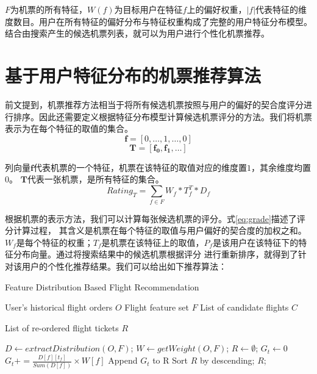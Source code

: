 $F$为机票的所有特征，$W(f)$为目标用户在特征$f$上的偏好权重，$|f|$代表特征的维度数目。用户在所有特征的偏好分布与特征权重构成了完整的用户特征分布模型。结合由搜索产生的候选机票列表，就可以为用户进行个性化机票推荐。

\section{基于用户特征分布的机票推荐算法}

前文提到，机票推荐方法相当于将所有候选机票按照与用户的偏好的契合度评分进行排序。因此还需要定义根据特征分布模型计算候选机票评分的方法。我们将机票表示为在每个特征的取值的集合。
\begin{equation}
  \mathbf{f} = [0,\dots,1,\dots,0]
\end{equation}
\begin{equation}
  \mathbf{T} = [\mathbf{f_0},\mathbf{f_1},\dots]
\end{equation}\par
列向量$\mathbf{f}$代表机票的一个特征，机票在该特征的取值对应的维度置$1$，其余维度均置$0$。
$\mathbf{T}$代表一张机票，是所有特征的集合。
\begin{equation}
	\label{eq:grade}
	Rating_T = \sum_{f \in F}W_f*T_f^T*D_f
\end{equation}

根据机票的表示方法，我们可以计算每张候选机票的评分。式\ref{eq:grade}描述了评分计算过程，
其含义是机票在每个特征的取值与用户偏好的契合度的加权之和。$W_f$是每个特征的权重；$T_f$是机票在该特征上的取值，$P_f$是该用户在该特征下的特征分布向量。通过将搜索结果中的候选机票根据评分
进行重新排序，就得到了针对该用户的个性化推荐结果。我们可以给出如下推荐算法：

\begin{algorithm}
\caption{Feature Distribution Based Flight Recommendation}
\label{algo:pref_rec}
\begin{algorithmic}[1]
\Require
\Statex User's historical flight orders $O$
\Statex Flight feature set $F$
\Statex List of candidate flights $C$

\Ensure 
\Statex List of re-ordered flight tickets $R$

\State $D \gets extractDistribution(O,F)$;
\State $W \gets getWeight(O,F)$;
\State $R \gets \emptyset$;
\State $G_t \gets 0$
\State $G_t += \frac{D[f][t_f]}{Sum(D[f])} \times W[f] $
\EndFor
\State Append $G_t$ to R
\EndFor 
\State Sort $R$ by descending;
\State \Return $R$;
\end{algorithmic}
\end{algorithm}



